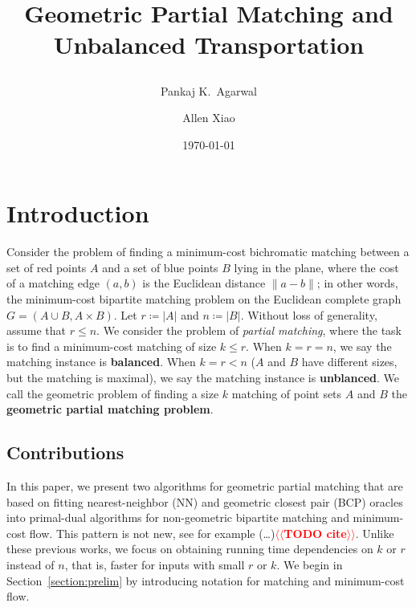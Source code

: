 \documentclass[11pt]{article}
\title{ Geometric Partial Matching and Unbalanced Transportation %
\date{\today} %
\author{
Pankaj K.\ Agarwal
\and
Allen Xiao
}
}
\makeatletter
\theoremstyle{plain}
\numberwithin{figure}{section}
\def\EMPH#1{\textbf{\boldmath #1}}
\def\n@te#1{\textsf{\boldmath \textbf{$\langle\!\langle$#1$\rangle\!\rangle$}}\leavevmode}
\def\note#1{\textcolor{red}{\n@te{#1}}}
\makeatother
\begin{document}
\maketitle

\section{Introduction}

Consider the problem of finding a minimum-cost bichromatic matching between
a set of red points $A$ and a set of blue points $B$ lying in the plane,
where the cost of a matching edge $(a, b)$ is the Euclidean distance
$\|a - b\|$;
in other words, the minimum-cost bipartite matching problem on the Euclidean
complete graph $G = (A \cup B, A \times B)$.
Let $r \coloneqq |A|$ and $n \coloneqq |B|$.
Without loss of generality, assume that $r \leq n$.
We consider the problem of \emph{partial matching}, where the task is to
find a minimum-cost matching of size $k \leq r$.
When $k = r = n$, we say the matching instance is \EMPH{balanced}.
When $k = r < n$ ($A$ and $B$ have different sizes, but the matching is
maximal), we say the matching instance is \EMPH{unblanced}.
We call the geometric problem of finding a size $k$ matching of point sets $A$
and $B$ the \EMPH{geometric partial matching problem}.



\subsection{Contributions}

In this paper, we present two algorithms for geometric partial matching
that are based on fitting nearest-neighbor (NN) and geometric closest pair
(BCP) oracles into primal-dual algorithms for non-geometric bipartite matching
and minimum-cost flow.
This pattern is not new, see for example
(\ldots)\note{TODO cite}.
Unlike these previous works, we focus on obtaining running time dependencies on
$k$ or $r$ instead of $n$, that is, faster for inputs with small $r$ or $k$.
We begin in Section~\ref{section:prelim} by introducing notation for matching
and minimum-cost flow.
\end{document}
